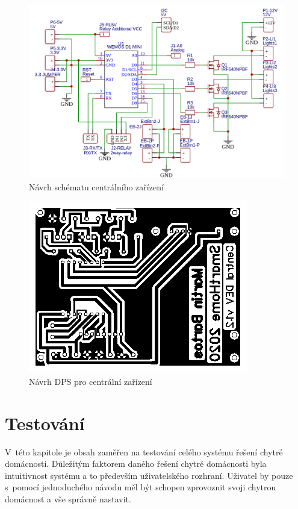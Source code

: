 \begin{figure}[hbt]
  \centering
  \includegraphics[width=1 \linewidth]{obrazky-figures/schematic.png}
  \caption{Návrh schématu centrálního zařízení}
  \label{figure:schema}
\end{figure}

\begin{figure}[hbt]
  \centering
  \includegraphics[width=0.6 \linewidth]{obrazky-figures/pcb.png}
  \caption{Návrh DPS pro centrální zařízení}
  \label{figure:schema}
\end{figure}

\chapter{Testování}
\label{testovani}
V~této kapitole je obsah zaměřen na testování celého systému řešení chytré domácnosti.
Důležitým faktorem daného řešení chytré domácnosti byla intuitivnost systému a to především uživatelského rozhraní.
Uživatel by pouze s~pomocí jednoduchého návodu měl být schopen zprovoznit svoji chytrou domácnost a vše správně nastavit.

